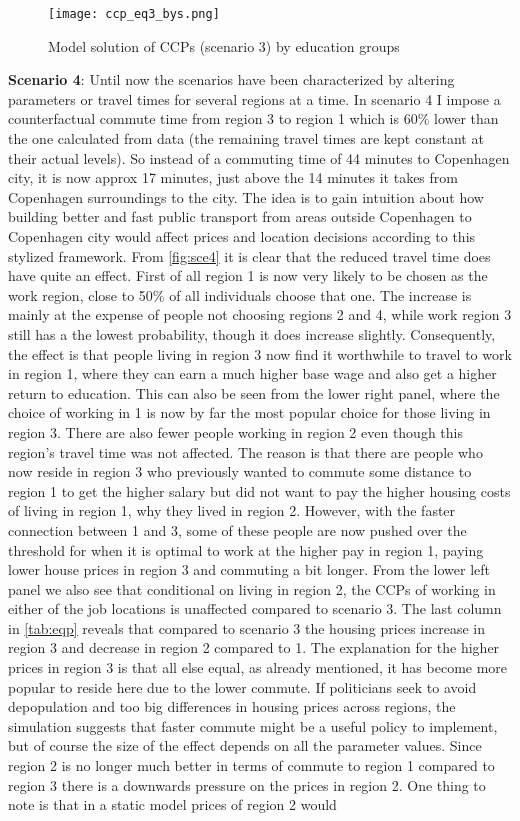 \begin{figure}
\centering
\texttt{[image: ccp\_eq3\_bys.png]} 
\caption{Model solution of CCPs (scenario 3) by education groups}
\label{fig:sce3s}
\end{figure}

\textbf{Scenario 4}: Until now the scenarios have been characterized by altering parameters or travel times for several regions at a time. In scenario 4 I impose a counterfactual commute time from region 3 to region 1 which is 60\% lower than the one calculated from data (the remaining travel times are kept constant at their actual levels). So instead of a commuting time of 44 minutes to Copenhagen city, it is now approx 17 minutes, just above the 14 minutes it takes from Copenhagen surroundings to the city. The idea is to gain intuition about how building better and fast public transport from areas outside Copenhagen to Copenhagen city would affect prices and location decisions according to this stylized framework. From \autoref{fig:sce4} it is clear that the reduced travel time does have quite an effect. First of all region 1 is now very likely to be chosen as the work region, close to 50\% of all individuals choose that one. The increase is mainly at the expense of people not choosing regions 2 and 4, while work region 3 still has a the lowest probability, though it does increase slightly. Consequently, the effect is that people living in region 3 now find it worthwhile to travel to work in region 1, where they can earn a much higher base wage and also get a higher return to education. This can also be seen from the lower right panel, where the choice of working in 1 is now by far the most popular choice for those living in region 3. There are also fewer people working in region 2 even though this region's travel time was not affected. The reason is that there are people who now reside in region 3 who previously wanted to commute some distance to region 1 to get the higher salary but did not want to pay the higher housing costs of living in region 1, why they lived in region 2. However, with the faster connection between 1 and 3, some of these people are now pushed over the threshold for when it is optimal to work at the higher pay in region 1, paying lower house prices in region 3 and commuting a bit longer. From the lower left panel we also see that conditional on living in region 2, the CCPs of working in either of the job locations is unaffected compared to scenario 3. The last column in \autoref{tab:eqp} reveals that compared to scenario 3 the housing prices increase in region 3 and decrease in region 2 compared to 1. The explanation for the higher prices in region 3 is that all else equal, as already mentioned, it has become more popular to reside here due to the lower commute. If politicians seek to avoid depopulation and too big differences in housing prices across regions, the simulation suggests that faster commute might be a useful policy to implement, but of course the size of the effect depends on all the parameter values. Since region 2 is no longer much better in terms of commute to region 1 compared to region 3 there is a downwards pressure on the prices in region 2. One thing to note is that in a static model prices of region 2 would 
